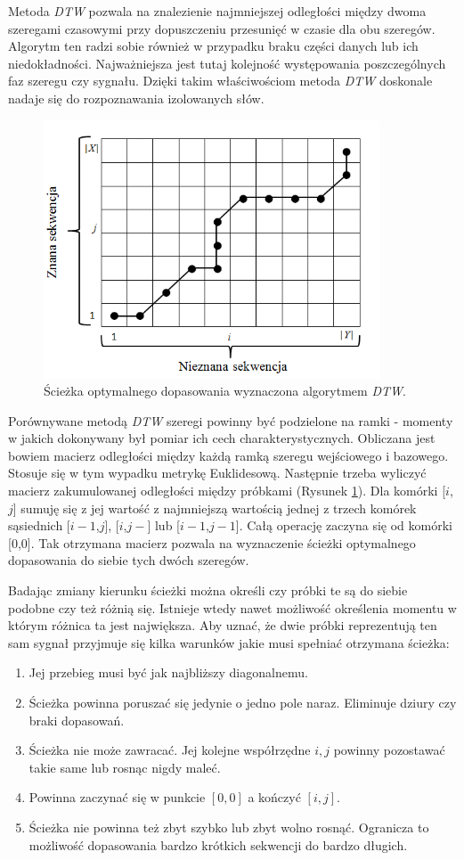 \documentclass{classrep}
\begin{document}
Metoda \textit{DTW} pozwala na znalezienie najmniejszej odległości między dwoma szeregami czasowymi przy
dopuszczeniu przesunięć w czasie dla obu szeregów. Algorytm ten radzi sobie również w przypadku braku części danych lub ich niedokładności. Najważniejsza jest tutaj kolejność występowania poszczególnych faz szeregu czy sygnału. Dzięki takim właściwościom metoda \textit{DTW} doskonale nadaje się do rozpoznawania izolowanych słów.
\begin{figure}[h!]
\centering
\includegraphics[width=10cm]{DTW.PNG} 
\caption{Ścieżka optymalnego dopasowania wyznaczona algorytmem \textit{DTW}.}
\label{fig:DTW}
\end{figure}
Porównywane metodą \textit{DTW} szeregi powinny być podzielone na ramki - momenty w jakich dokonywany był pomiar ich cech charakterystycznych. Obliczana jest bowiem macierz odległości między każdą ramką szeregu wejściowego i bazowego. Stosuje się w tym wypadku metrykę Euklidesową. Następnie trzeba wyliczyć macierz zakumulowanej odległości między próbkami (Rysunek \ref{fig:DTW}). Dla komórki [$i$, $j$] sumuję się z jej wartość z najmniejszą wartością jednej z trzech komórek sąsiednich [$i-1$,$j$], [$i$,$j-$] lub [$i-1$,$j-1$]. Całą operację zaczyna się od komórki [$0$,$0$]. Tak otrzymana macierz pozwala na wyznaczenie ścieżki optymalnego dopasowania do siebie tych dwóch szeregów.

Badając zmiany kierunku ścieżki można określi czy próbki te są do siebie podobne czy też różnią się. Istnieje wtedy nawet możliwość określenia momentu w którym różnica ta jest największa. Aby uznać, że dwie próbki reprezentują ten sam sygnał przyjmuje się kilka warunków jakie musi spełniać otrzymana ścieżka:
\begin{enumerate}
\item Jej przebieg musi być jak najbliższy diagonalnemu.
\item Ścieżka powinna poruszać się jedynie o jedno pole naraz. Eliminuje dziury czy braki dopasowań.
\item Ścieżka nie może zawracać. Jej kolejne współrzędne $i,j$ powinny pozostawać takie same lub rosnąc nigdy maleć.
\item Powinna zaczynać się w punkcie $[0,0]$ a kończyć $[i,j]$.
\item Ścieżka nie powinna też zbyt szybko lub zbyt wolno rosnąć. Ogranicza to możliwość dopasowania bardzo krótkich sekwencji do bardzo długich.
\end{enumerate}
\end{document}
